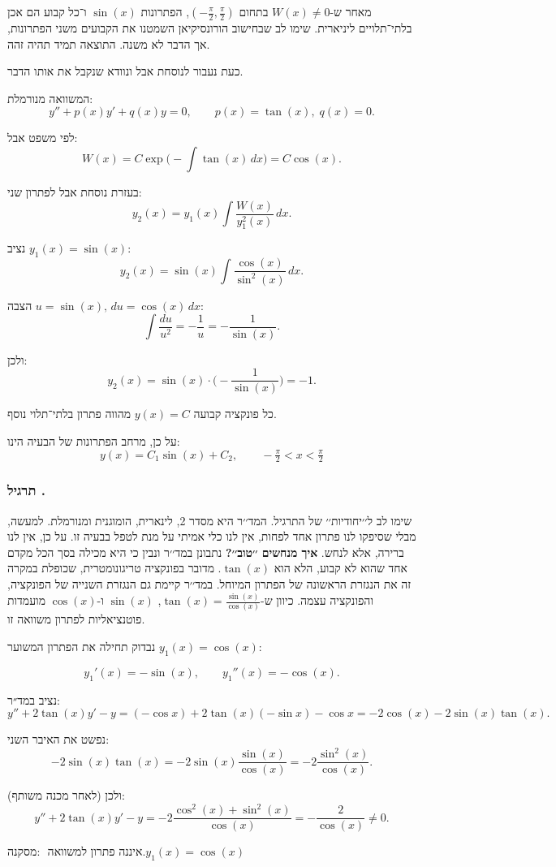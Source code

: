 \documentclass{article}
\numberwithin{equation}{section}
\newcounter{solution}[section]
\renewcommand{\thesolution}{\thesection.\arabic{solution}}
\newcommand{\solution}{%
  \refstepcounter{solution}%
  \subsubsection*{תרגיל \thesolution}%
  \label{sol:\thesolution}%
}
\begin{document}
מאחר ש-$W(x)\neq 0$ בתחום $(-\tfrac{\pi}{2},\tfrac{\pi}{2})$, הפתרונות $\sin(x)$ ו־כל קבוע הם אכן בלתי־תלויים ליניארית. שימו לב שבחישוב הורונסיקיאן השמטנו את הקבועים משני הפתרונות, אך הדבר לא משנה. התוצאה תמיד תהיה זהה.

כעת נעבור לנוסחת אבל ונוודא שנקבל את אותו הדבר. 

המשוואה מנורמלת:
\[
y''+p(x)y'+q(x)y=0, \qquad p(x)=\tan(x), \; q(x)=0.
\]

לפי משפט אבל:
\[
W(x)=C\exp\!\Big(-\int \tan(x)\,dx\Big)=C\cos(x).
\]

בעזרת נוסחת אבל לפתרון שני:
\[
y_2(x)=y_1(x)\int \frac{W(x)}{y_1^2(x)}\,dx.
\]

נציב $y_1(x)=\sin(x)$:
\[
y_2(x)=\sin(x)\int \frac{\cos(x)}{\sin^2(x)}\,dx.
\]

הצבה $u=\sin(x),\,du=\cos(x)\,dx$:
\[
\int \frac{du}{u^2}=-\frac{1}{u}=-\frac{1}{\sin(x)}.
\]

ולכן:
\[
y_2(x)=\sin(x)\cdot\Big(-\frac{1}{\sin(x)}\Big)=-1.
\]

כל פונקציה קבועה $y(x)=C$ מהווה פתרון בלתי־תלוי נוסף.

על כן, מרחב הפתרונות של הבעיה הינו:
\[
\boxed{y(x)=C_1\sin(x)+C_2, \qquad -\tfrac{\pi}{2}<x<\tfrac{\pi}{2}}
\]

\solution{}

שימו לב ל׳׳יחודיות׳׳ של התרגיל. המד׳׳ר היא מסדר 2, לינארית, הומוגנית ומנורמלת. למעשה, מבלי שסיפקו לנו פתרון אחד לפחות, אין לנו כלי אמיתי על מנת לטפל בבעיה זו. על כן, אין לנו ברירה, אלא לנחש. \textbf{איך מנחשים ׳׳טוב׳׳?} נתבונן במד׳׳ר ונבין כי היא מכילה בסך הכל מקדם אחד שהוא לא קבוע, הלא הוא $\tan(x)$. מדובר בפונקציה טריגונומטרית, שכופלת במקרה זה את הנגזרת הראשונה של הפתרון המיוחל. במד׳׳ר קיימת גם הנגזרת השנייה של הפונקציה, והפונקציה עצמה. כיוון ש-$\tan(x)=\frac{\sin(x)}{\cos(x)}$, $\sin(x)$ ו-$\cos(x)$ מועמדות פוטנציאליות לפתרון משוואה זו.

נבדוק תחילה את הפתרון המשוער \(y_1(x) = \cos(x)\):

\[
y_1'(x) = -\sin(x), \qquad y_1''(x) = -\cos(x).
\]

נציב במד״ר:
\[
y'' + 2\tan(x)y' - y = (-\cos x) + 2\tan(x)(-\sin x) - \cos x 
= -2\cos(x) - 2\sin(x)\tan(x).
\]

נפשט את האיבר השני:
\[
-2\sin(x)\tan(x) = -2\sin(x)\frac{\sin(x)}{\cos(x)} = -2\frac{\sin^2(x)}{\cos(x)}.
\]

ולכן (לאחר מכנה משותף):
\[
y'' + 2\tan(x)y' - y = -2\frac{\cos^2(x) + \sin^2(x)}{\cos(x)} = -\frac{2}{\cos(x)} \neq 0.
\]

מסקנה:  
\(\text{ איננה פתרון למשוואה.}{y_1(x) = \cos(x)} 
\)
\end{document}
